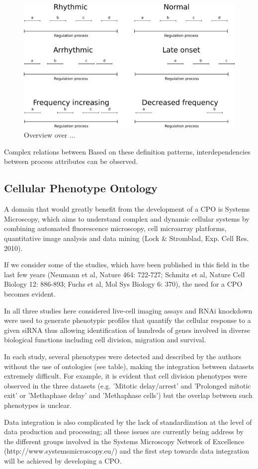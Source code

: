 \documentclass{bioinfo}
\begin{document}
\begin{figure}
  \centering
  \includegraphics[width=.5\textwidth]{processpatterns.pdf}
  \caption{Overview over ...\label{fig:patterns}}
\end{figure}

Complex relations between Based on these definition patterns,
interdependencies between process attributes can be observed.


\subsection{Cellular Phenotype Ontology}

A domain that would greatly benefit from the development of a CPO is
Systems Microscopy, which aims to understand complex and dynamic
cellular systems by combining automated fluorescence microscopy, cell
microarray platforms, quantitative image analysis and data mining
(Lock \& Stromblad, Exp. Cell Res. 2010).

If we consider some of the studies, which have been published in this
field in the last few years (Neumann et al, Nature 464: 722-727;
Schmitz et al, Nature Cell Biology 12: 886-893; Fuchs et al, Mol Sys
Biology 6: 370), the need for a CPO becomes evident.

In all three studies here considered live-cell imaging assays and RNAi
knockdown were used to generate phenotypic profiles that quantify the
cellular response to a given siRNA thus allowing identification of
hundreds of genes involved in diverse biological functions including
cell division, migration and survival.

In each study, several phenotypes were detected and described by the
authors without the use of ontologies (see table), making the
integration between datasets extremely difficult. For example, it is
evident that cell division phenotypes were observed in the three
datasets (e.g. 'Mitotic delay/arrest' and 'Prolonged mitotic exit' or
'Methaphase delay' and 'Methaphase cells') but the overlap between
such phenotypes is unclear.

Data integration is also complicated by the lack of standardization at
the level of data production and processing; all these issues are
currently being address by the different groups involved in the
Systems Microscopy Network of Excellence
(http://www.systemsmicroscopy.eu/) and the first step towards data
integration will be achieved by developing a CPO.
\end{document}
